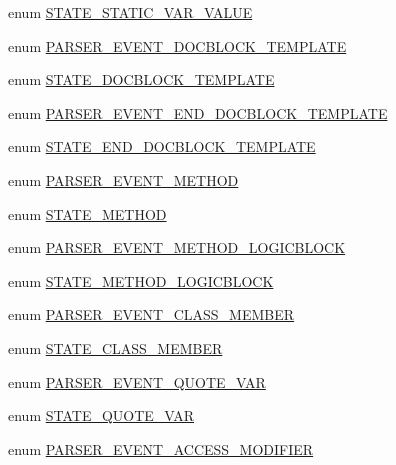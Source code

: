 \begin{DoxyCompactItemize}
\item 
enum \hyperlink{_parser_8inc_afe312837f15f352b0de1e0498bf58e19}{\-S\-T\-A\-T\-E\-\_\-\-S\-T\-A\-T\-I\-C\-\_\-\-V\-A\-R\-\_\-\-V\-A\-L\-U\-E} 
\item 
enum \hyperlink{_parser_8inc_a25a8c2b1ac1b0efb119c39ffb91bbd35}{\-P\-A\-R\-S\-E\-R\-\_\-\-E\-V\-E\-N\-T\-\_\-\-D\-O\-C\-B\-L\-O\-C\-K\-\_\-\-T\-E\-M\-P\-L\-A\-T\-E} 
\item 
enum \hyperlink{_parser_8inc_afb3c6e387343a9f3e1360a1c3230e01b}{\-S\-T\-A\-T\-E\-\_\-\-D\-O\-C\-B\-L\-O\-C\-K\-\_\-\-T\-E\-M\-P\-L\-A\-T\-E} 
\item 
enum \hyperlink{_parser_8inc_a109ecfb65b41e35de112e01a12fa2854}{\-P\-A\-R\-S\-E\-R\-\_\-\-E\-V\-E\-N\-T\-\_\-\-E\-N\-D\-\_\-\-D\-O\-C\-B\-L\-O\-C\-K\-\_\-\-T\-E\-M\-P\-L\-A\-T\-E} 
\item 
enum \hyperlink{_parser_8inc_adb84867ab0d4a49a8fcc34005bd949f6}{\-S\-T\-A\-T\-E\-\_\-\-E\-N\-D\-\_\-\-D\-O\-C\-B\-L\-O\-C\-K\-\_\-\-T\-E\-M\-P\-L\-A\-T\-E} 
\item 
enum \hyperlink{_parser_8inc_ab788a50bb932b07732981802a8c55499}{\-P\-A\-R\-S\-E\-R\-\_\-\-E\-V\-E\-N\-T\-\_\-\-M\-E\-T\-H\-O\-D} 
\item 
enum \hyperlink{_parser_8inc_ab09a2f652eec586f191d7f7b5427bdf8}{\-S\-T\-A\-T\-E\-\_\-\-M\-E\-T\-H\-O\-D} 
\item 
enum \hyperlink{_parser_8inc_a77b15d186381b9e3e280ceb4d756b247}{\-P\-A\-R\-S\-E\-R\-\_\-\-E\-V\-E\-N\-T\-\_\-\-M\-E\-T\-H\-O\-D\-\_\-\-L\-O\-G\-I\-C\-B\-L\-O\-C\-K} 
\item 
enum \hyperlink{_parser_8inc_a019f56bcda3a3a22838fd4602280a230}{\-S\-T\-A\-T\-E\-\_\-\-M\-E\-T\-H\-O\-D\-\_\-\-L\-O\-G\-I\-C\-B\-L\-O\-C\-K} 
\item 
enum \hyperlink{_parser_8inc_a3b7642042734c3ebbe8159818326d77d}{\-P\-A\-R\-S\-E\-R\-\_\-\-E\-V\-E\-N\-T\-\_\-\-C\-L\-A\-S\-S\-\_\-\-M\-E\-M\-B\-E\-R} 
\item 
enum \hyperlink{_parser_8inc_ae419d5a33ab271db14415977977cef73}{\-S\-T\-A\-T\-E\-\_\-\-C\-L\-A\-S\-S\-\_\-\-M\-E\-M\-B\-E\-R} 
\item 
enum \hyperlink{_parser_8inc_ab94387562e4f84fe2f5683d5eb0f0313}{\-P\-A\-R\-S\-E\-R\-\_\-\-E\-V\-E\-N\-T\-\_\-\-Q\-U\-O\-T\-E\-\_\-\-V\-A\-R} 
\item 
enum \hyperlink{_parser_8inc_a17d02e9f1470078199e148eb54941eac}{\-S\-T\-A\-T\-E\-\_\-\-Q\-U\-O\-T\-E\-\_\-\-V\-A\-R} 
\item 
enum \hyperlink{_parser_8inc_aa3128ca12119310f159f02621eec0352}{\-P\-A\-R\-S\-E\-R\-\_\-\-E\-V\-E\-N\-T\-\_\-\-A\-C\-C\-E\-S\-S\-\_\-\-M\-O\-D\-I\-F\-I\-E\-R} 

\end{DoxyCompactItemize}
